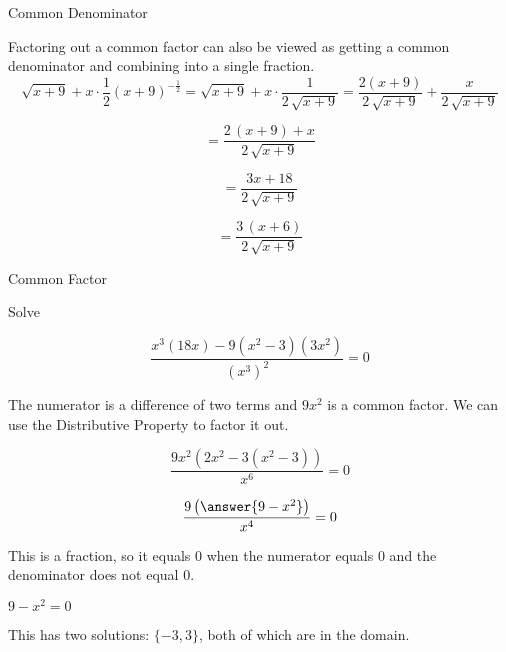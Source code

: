 \documentclass{ximera}
\begin{document}
\begin{example}  Common Denominator

\begin{explanation}


Factoring out a common factor can also be viewed as getting a common denominator and combining into a single fraction. \\


\[
\sqrt{x+9} + x \cdot \frac{1}{2} (x+9)^{-\tfrac{1}{2}} = \sqrt{x+9} + x \cdot \frac{1}{2 \, \sqrt{x+9}} = \frac{2(x+9)}{2 \, \sqrt{x+9}} +  \frac{x}{2 \, \sqrt{x+9}}   
\]


\[
= \frac{2 \, (x + 9) + x}{2 \, \sqrt{x+9}}   
\]


\[
= \frac{3x + 18}{2 \, \sqrt{x+9}}   
\]


\[
= \frac{3 \, (x + 6)}{2 \, \sqrt{x+9}}   
\]

\end{explanation}
\end{example}









\begin{example}  Common Factor


Solve 

\[  \frac{x^3 (18x) - 9(x^2-3)(3x^2)}{(x^3)^2} = 0 \]



\begin{explanation}


The numerator is a difference of two terms and $9 x^2$ is a common factor.  We can use the Distributive Property to factor it out.



\[  \frac{9x^2 (2x^2 - 3(x^2-3))}{x^6} = 0  \]


\[  \frac{9 \left( \answer{9 - x^2} \right)}{x^4} = 0 \]



This is a fraction, so it equals $0$ when the numerator equals $0$ and the denominator does not equal $0$.


$9 - x^2 = 0$

This has two solutions: $\{ -3, 3  \}$, both of which are in the domain.






\end{explanation}

\end{example}
\end{document}
